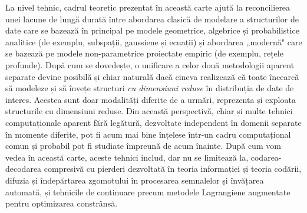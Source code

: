 \documentclass[../../book-main_ro.tex]{subfiles}
\begin{document}
La nivel tehnic, cadrul teoretic prezentat în această carte ajută la reconcilierea unei lacune de lungă durată între abordarea clasică de modelare a structurilor de date care se bazează în principal pe modele geometrice, algebrice și probabilistice analitice (de exemplu, subspații, gaussiene și ecuații) și abordarea „modernă" care se bazează pe modele non-parametrice proiectate empiric (de exemplu, rețele profunde). După cum se dovedește, o unificare a celor două metodologii aparent separate devine posibilă și chiar naturală dacă cineva realizează că toate încearcă să modeleze și să învețe structuri {\em cu dimensiuni reduse} în distribuția de date de interes. Acestea sunt doar modalități diferite de a urmări, reprezenta și exploata structurile cu dimensiuni reduse. Din această perspectivă, chiar și multe tehnici computaționale aparent fără legătură, dezvoltate independent în domenii separate în momente diferite, pot fi acum mai bine înțelese într-un cadru computațional comun și probabil pot fi studiate împreună de acum înainte. După cum vom vedea în această carte, aceste tehnici includ, dar nu se limitează la, codarea-decodarea compresivă cu pierderi dezvoltată în teoria informației și teoria codării, difuzia și îndepărtarea zgomotului în procesarea semnalelor și învățarea automată, și tehnicile de continuare precum metodele Lagrangiene augmentate pentru optimizarea constrânsă.
\end{document}
